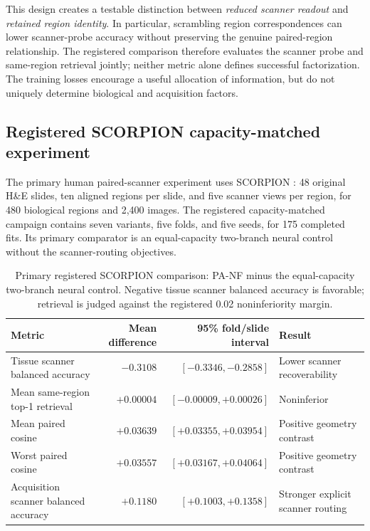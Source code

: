 This design creates a testable distinction between \emph{reduced scanner readout} and \emph{retained region identity}. In particular, scrambling region correspondences can lower scanner-probe accuracy without preserving the genuine paired-region relationship. The registered comparison therefore evaluates the scanner probe and same-region retrieval jointly; neither metric alone defines successful factorization. The training losses encourage a useful allocation of information, but do not uniquely determine biological and acquisition factors.

\subsection{Registered SCORPION capacity-matched experiment}
The primary human paired-scanner experiment uses SCORPION \cite{ryu2023scorpion}: 48 original H\&E slides, ten aligned regions per slide, and five scanner views per region, for 480 biological regions and 2,400 images. The registered capacity-matched campaign contains seven variants, five folds, and five seeds, for 175 completed fits. Its primary comparator is an equal-capacity two-branch neural control without the scanner-routing objectives.

\begin{table}[t]
\centering
\caption{Primary registered SCORPION comparison: PA-NF minus the equal-capacity two-branch neural control. Negative tissue scanner balanced accuracy is favorable; retrieval is judged against the registered 0.02 noninferiority margin.}
\label{tab:scorpion_primary}
\small
\begin{tabular}{lrrl}
\toprule
Metric & Mean difference & 95\% fold/slide interval & Result \\
\midrule
Tissue scanner balanced accuracy & $-0.3108$ & $[-0.3346,-0.2858]$ & Lower scanner recoverability \\
Mean same-region top-1 retrieval & $+0.00004$ & $[-0.00009,+0.00026]$ & Noninferior \\
Mean paired cosine & $+0.03639$ & $[+0.03355,+0.03954]$ & Positive geometry contrast \\
Worst paired cosine & $+0.03557$ & $[+0.03167,+0.04064]$ & Positive geometry contrast \\
Acquisition scanner balanced accuracy & $+0.1180$ & $[+0.1003,+0.1358]$ & Stronger explicit scanner routing \\
\bottomrule
\end{tabular}
\end{table}

